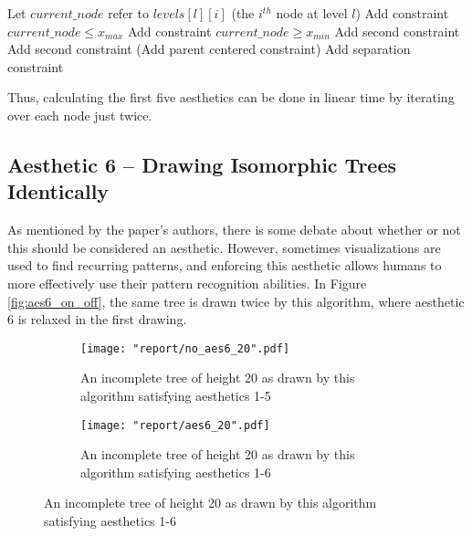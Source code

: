 \documentclass[11pt]{report}
\begin{document}
\begin{algorithm}[H]
    \caption{Tree Layout -- Calculating Aesthetics 1-5}
    \begin{algorithmic}[1]
             
            \State Let $current\_node$ refer to $levels[l][i]$ (the $i^{th}$ node at level $l$)
            \State Add constraint $current\_node \leq x_{max}$ 
            \State Add constraint $current\_node \geq x_{min}$
                \State Add second constraint
            \EndIf
                \State Add second constraint
            \EndIf
                \State (Add parent centered constraint)
            \EndIf
                \State Add separation constraint
            \EndIf
            \EndFor
        \EndFor
        \EndProcedure
    \end{algorithmic}
\end{algorithm}

Thus, calculating the first five aesthetics can be done in linear time by iterating over each node just twice.

\subsection{Aesthetic 6 -- Drawing Isomorphic Trees Identically}
As mentioned by the paper's authors, there is some debate about whether or not this should be considered an aesthetic. However, sometimes visualizations are used to find recurring patterns, and enforcing this aesthetic allows humans to more effectively use their pattern recognition abilities. In Figure \ref{fig:aes6_on_off}, the same tree is drawn twice by this algorithm, where aesthetic 6 is relaxed in the first drawing.

\begin{figure}[H]
    \label{fig:aes6_on_off}
    \begin{subfigure}{\linewidth}
        \centering
        \texttt{[image: "report/no\_aes6\_20".pdf]}
        \caption{An incomplete tree of height 20 as drawn by this algorithm satisfying aesthetics 1-5}
    \end{subfigure}
    
    \begin{subfigure}{\linewidth}
    \centering
    \texttt{[image: "report/aes6\_20".pdf]}
    \caption{An incomplete tree of height 20 as drawn by this algorithm satisfying aesthetics 1-6}
    \end{subfigure}
\end{figure}
\end{document}
